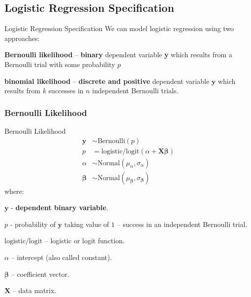 \subsection{Logistic Regression Specification}
\begin{frame}{Logistic Regression Specification}
	We can model logistic regression using two approaches:
	\begin{vfilleditems}
		\item \textbf{Bernoulli likelihood} --
		\textbf{binary} dependent variable \textbf{y} which results from a
		Bernoulli trial with some probability $p$
		\item \textbf{binomial likelihood} --
		\textbf{discrete and positive} dependent variable $\textbf{y}$
		which results from $k$ successes in $n$ independent Bernoulli
		trials.
	\end{vfilleditems}
\end{frame}

\subsubsection{Bernoulli Likelihood}
\begin{frame}{Bernoulli Likelihood}
	\small
	$$
		\begin{aligned}
			\mathbf{y}         & \sim \text{Bernoulli}\left( p\right)                                      \\
			p                  & = \text{logistic/logit}(\alpha +  \mathbf{X} \boldsymbol{\beta})          \\
			\alpha             & \sim \text{Normal}(\mu_\alpha, \sigma_\alpha)                             \\
			\boldsymbol{\beta} & \sim \text{Normal}(\mu_{\boldsymbol{\beta}}, \sigma_{\boldsymbol{\beta}})
		\end{aligned}
	$$
	where:
	\begin{vfilleditems}
		\item \small $\mathbf{y}$ - \textbf{dependent binary variable}.
		\item \small $p$ - probability of $\mathbf{y}$ taking value of $1$ --
		success in an independent Bernoulli trial.
		\item \small $\text{logistic/logit}$ -- logistic or logit function.
		\item \small $\alpha$ -- intercept (also called constant).
		\item \small $\boldsymbol{\beta}$ -- coefficient vector.
		\item \small $\mathbf{X}$ -- data matrix.
	\end{vfilleditems}
\end{frame}


